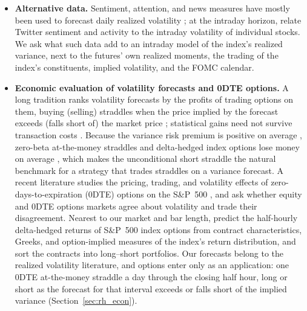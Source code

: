 \begin{itemize}
\item \textbf{Alternative data.} Sentiment, attention, and news measures have mostly been used to forecast daily
  realized volatility \citep{AudrinoSigristBallinari2020,CaporinPoli2017}; at the intraday horizon,
  \citet{BehrendtSchmidt2018} relate Twitter sentiment and activity to the intraday volatility of individual stocks.
  We ask what such data add to an intraday model of the index's realized variance, next to the futures' own
  realized moments, the trading of the index's constituents, implied volatility, and the FOMC calendar.
\item \textbf{Economic evaluation of volatility forecasts and 0DTE options.} A long tradition ranks volatility
  forecasts by the profits of trading options on them, buying (selling) straddles when the price implied by the
  forecast exceeds (falls short of) the market price \citep{EngleHongKaneNoh1993,NohEngleKane1994,
  BandiRussellYang2008}; statistical gains need not survive transaction costs
  \citep{HarveyWhaley1992,ChanJhaKalimipalli2009}. Because the variance risk premium is positive on average
  \citep{CarrWu2009,BollerslevTauchenZhou2009}, zero-beta at-the-money straddles and delta-hedged index options lose
  money on average \citep{CovalShumway2001,BakshiKapadia2003}, which makes the unconditional short straddle the
  natural benchmark for a strategy that trades straddles on a variance forecast. A recent literature studies the
  pricing, trading, and volatility effects of zero-days-to-expiration (0DTE) options on the S\&P~500
  \citep{BandiFusariReno2023,BeckmeyerBrangerGayda2023,DimErakerVilkov2024}, and \citet{ChongTodorov2026} ask
  whether equity and 0DTE options markets agree about volatility and trade their disagreement. Nearest to our market
  and bar length, \citet{MaischZhangUlrichZimmer2026} predict the half-hourly delta-hedged returns of S\&P~500 index
  options from contract characteristics, Greeks, and option-implied measures of the index's return distribution,
  and sort the contracts into long--short portfolios. Our forecasts belong to the realized volatility literature,
  and options enter only as an application: one 0DTE at-the-money straddle a day through the closing half hour,
  long or short as the forecast for that interval exceeds or falls short of the implied variance
  (Section~\ref{sec:rh_econ}).
\end{itemize}

